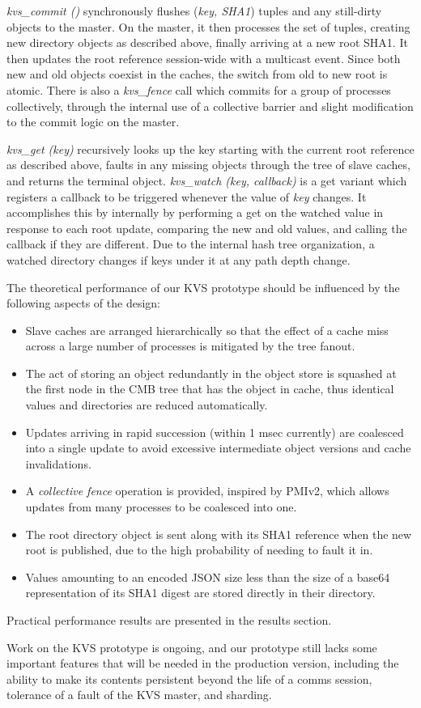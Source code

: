 {\em kvs\_commit ()} synchronously flushes ({\em key, SHA1}) tuples
and any still-dirty objects to the master.  On the master, it then
processes the set of tuples, creating new directory objects as described
above, finally arriving at a new root SHA1.  It then updates the 
root reference session-wide with a multicast event.
Since both new and old objects coexist in the caches, the switch from old
to new root is atomic.
There is also a {\em kvs\_fence} call which commits for a group of
processes collectively, through the internal use of a collective barrier
and slight modification to the commit logic on the master.

{\em kvs\_get (key)} recursively looks up the key starting with the
current root reference as described above, faults in any missing objects
through the tree of slave caches, and returns the terminal object.
{\em kvs\_watch (key, callback)} is a get variant which registers a
callback to be triggered whenever the value of {\em key} changes.
It accomplishes this by internally by performing a get on the watched
value in response to each root update, comparing the new
and old values, and calling the callback if they are different.
Due to the internal hash tree organization, a watched directory changes
if keys under it at any path depth change.

The theoretical performance of our KVS prototype should be influenced by
the following aspects of the design:
\begin{itemize}
\item{Slave caches are arranged hierarchically so that the effect of a
cache miss across a large number of processes is mitigated by the tree
fanout.}
\item{The act of storing an object redundantly in the object store
is squashed at the first node in the CMB tree that has the object
in cache, thus identical values and directories are reduced automatically.}
\item{Updates arriving in rapid succession (within 1 msec currently) are
coalesced into a single update to avoid excessive intermediate object
versions and cache invalidations.}
\item{A {\em collective fence} operation is provided, inspired by PMIv2,
which allows updates from many processes to be coalesced into one.}
\item{The root directory object is sent along with its SHA1 reference when the
new root is published, due to the high probability of needing to fault it in.}
\item{Values amounting to an encoded JSON size less than the size of a base64
representation of its SHA1 digest are stored directly in their directory.}
\end{itemize}
Practical performance results are presented in the results section.

Work on the KVS prototype is ongoing, and our prototype still lacks some
important features that will be needed in the production version,
including the ability to make its contents persistent beyond the
life of a comms session,
tolerance of a fault of the KVS master,
and sharding.
